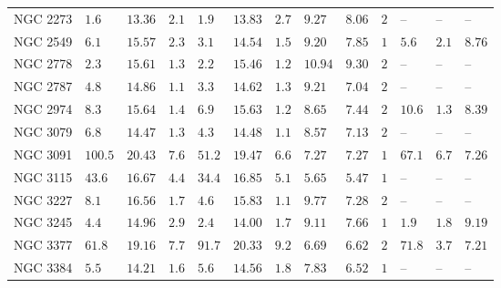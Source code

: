 \begin{table*}
\begin{center}
\begin{tabular}{lllllllllllll}
NGC 2273  \quad &  $1.6$  &  $13.36$  &  $2.1$  \quad \quad &  $1.9$  &  $13.83$  &  $2.7$  &  $9.27$  &  $8.06$  \quad \quad &  $2$  \quad \quad &   -- &   -- &   --    \\ 
NGC 2549  \quad &  $6.1$  &  $15.57$  &  $2.3$  \quad \quad &  $3.1$  &  $14.54$  &  $1.5$  &  $9.20$  &  $7.85$  \quad \quad &  $1$  \quad \quad &  $5.6$  &  $2.1$  &  $8.76$  \\ 
NGC 2778  \quad &  $2.3$  &  $15.61$  &  $1.3$  \quad \quad &  $2.2$  &  $15.46$  &  $1.2$  &  $10.94$  &  $9.30$  \quad \quad &  $2$  \quad \quad &   -- &   -- &   --    \\ 
NGC 2787  \quad &  $4.8$  &  $14.86$  &  $1.1$  \quad \quad &  $3.3$  &  $14.62$  &  $1.3$  &  $9.21$  &  $7.04$  \quad \quad &  $2$  \quad \quad &   -- &   -- &   --    \\ 
NGC 2974  \quad &  $8.3$  &  $15.64$  &  $1.4$  \quad \quad &  $6.9$  &  $15.63$  &  $1.2$  &  $8.65$  &  $7.44$  \quad \quad &  $2$  \quad \quad &  $10.6$  &  $1.3$  &  $8.39$  \\ 
NGC 3079  \quad &  $6.8$  &  $14.47$  &  $1.3$  \quad \quad &  $4.3$  &  $14.48$  &  $1.1$  &  $8.57$  &  $7.13$  \quad \quad &  $2$  \quad \quad &   -- &   -- &   --    \\ 
NGC 3091  \quad &  $100.5$  &  $20.43$  &  $7.6$  \quad \quad &  $51.2$  &  $19.47$  &  $6.6$  &  $7.27$  &  $7.27$  \quad \quad &  $1$  \quad \quad &  $67.1$  &  $6.7$  &  $7.26$  \\ 
NGC 3115  \quad &  $43.6$  &  $16.67$  &  $4.4$  \quad \quad &  $34.4$  &  $16.85$  &  $5.1$  &  $5.65$  &  $5.47$  \quad \quad &  $1$  \quad \quad &   -- &   -- &   --    \\ 
NGC 3227  \quad &  $8.1$  &  $16.56$  &  $1.7$  \quad \quad &  $4.6$  &  $15.83$  &  $1.1$  &  $9.77$  &  $7.28$  \quad \quad &  $2$  \quad \quad &   -- &   -- &   --    \\ 
NGC 3245  \quad &  $4.4$  &  $14.96$  &  $2.9$  \quad \quad &  $2.4$  &  $14.00$  &  $1.7$  &  $9.11$  &  $7.66$  \quad \quad &  $1$  \quad \quad &  $1.9$  &  $1.8$  &  $9.19$  \\ 
NGC 3377  \quad &  $61.8$  &  $19.16$  &  $7.7$  \quad \quad &  $91.7$  &  $20.33$  &  $9.2$  &  $6.69$  &  $6.62$  \quad \quad &  $2$  \quad \quad &  $71.8$  &  $3.7$  &  $7.21$  \\ 
NGC 3384  \quad &  $5.5$  &  $14.21$  &  $1.6$  \quad \quad &  $5.6$  &  $14.56$  &  $1.8$  &  $7.83$  &  $6.52$  \quad \quad &  $1$  \quad \quad &   -- &   -- &   --    \\ 

\end{tabular}
\end{center}
\end{table*}
